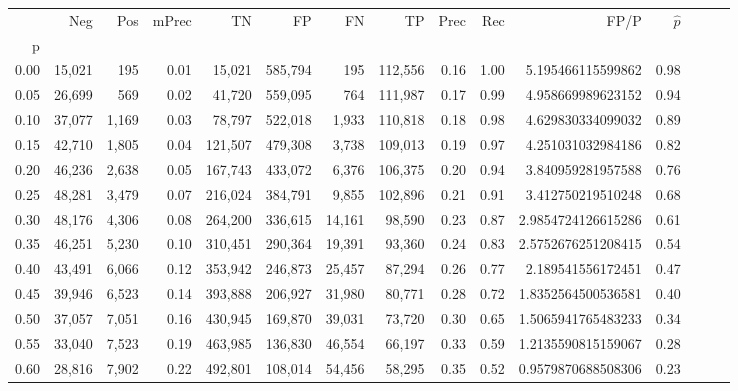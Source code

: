\begin{tabular}{rrrrrrrrrrrrrrr}
\toprule
{} &     Neg &    Pos & mPrec &       TN &       FP &       FN &       TP &  Prec &   Rec &                 FP/P & $\hat{p}$ \\
p    &         &        &       &          &          &          &          &       &       &                      &           \\
\midrule
0.00 &  15,021 &    195 &  0.01 &   15,021 &  585,794 &      195 &  112,556 &  0.16 &  1.00 &    5.195466115599862 &      0.98 \\
0.05 &  26,699 &    569 &  0.02 &   41,720 &  559,095 &      764 &  111,987 &  0.17 &  0.99 &    4.958669989623152 &      0.94 \\
0.10 &  37,077 &  1,169 &  0.03 &   78,797 &  522,018 &    1,933 &  110,818 &  0.18 &  0.98 &    4.629830334099032 &      0.89 \\
0.15 &  42,710 &  1,805 &  0.04 &  121,507 &  479,308 &    3,738 &  109,013 &  0.19 &  0.97 &    4.251031032984186 &      0.82 \\
0.20 &  46,236 &  2,638 &  0.05 &  167,743 &  433,072 &    6,376 &  106,375 &  0.20 &  0.94 &    3.840959281957588 &      0.76 \\
0.25 &  48,281 &  3,479 &  0.07 &  216,024 &  384,791 &    9,855 &  102,896 &  0.21 &  0.91 &    3.412750219510248 &      0.68 \\
0.30 &  48,176 &  4,306 &  0.08 &  264,200 &  336,615 &   14,161 &   98,590 &  0.23 &  0.87 &   2.9854724126615286 &      0.61 \\
0.35 &  46,251 &  5,230 &  0.10 &  310,451 &  290,364 &   19,391 &   93,360 &  0.24 &  0.83 &   2.5752676251208415 &      0.54 \\
0.40 &  43,491 &  6,066 &  0.12 &  353,942 &  246,873 &   25,457 &   87,294 &  0.26 &  0.77 &    2.189541556172451 &      0.47 \\
0.45 &  39,946 &  6,523 &  0.14 &  393,888 &  206,927 &   31,980 &   80,771 &  0.28 &  0.72 &   1.8352564500536581 &      0.40 \\
0.50 &  37,057 &  7,051 &  0.16 &  430,945 &  169,870 &   39,031 &   73,720 &  0.30 &  0.65 &   1.5065941765483233 &      0.34 \\
0.55 &  33,040 &  7,523 &  0.19 &  463,985 &  136,830 &   46,554 &   66,197 &  0.33 &  0.59 &   1.2135590815159067 &      0.28 \\
0.60 &  28,816 &  7,902 &  0.22 &  492,801 &  108,014 &   54,456 &   58,295 &  0.35 &  0.52 &   0.9579870688508306 &      0.23 \\

\end{tabular}
